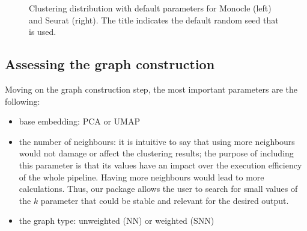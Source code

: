 \begin{figure}[H]
    \centering
    \caption{\label{fig:ca-feat-stab}Clustering distribution with default parameters for Monocle (left) and Seurat (right). The title indicates the default random seed that is used.}
\end{figure}

\subsection{Assessing the graph construction}
Moving on the graph construction step, the most important parameters are the following:
\begin{itemize}
    \item base embedding: PCA or UMAP
    \item the number of neighbours: it is intuitive to say that using more neighbours would not damage or affect the clustering results; the purpose of including this parameter is that its values have an impact over the execution efficiency of the whole pipeline. Having more neighbours would lead to more calculations. Thus, our package allows the user to search for small values of the $k$ parameter that could be stable and relevant for the desired output.
    \item the graph type: unweighted (NN) or weighted (SNN)
\end{itemize}

